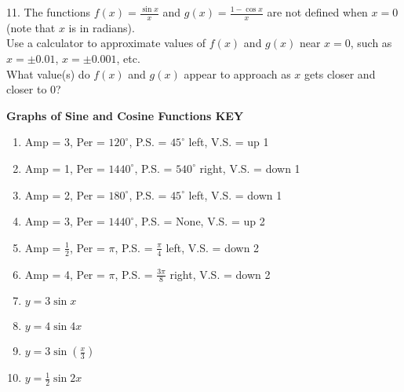 \documentclass{article}
\begin{document}
11. The functions $f(x) = \frac{\sin x}{x}$ and $g(x) = \frac{1 - \cos x}{x}$ are not defined when $x = 0$ (note that $x$ is in radians).
\newline\\


Use a calculator to approximate values of $f(x)$ and $g(x)$ near $x = 0$, such as $x = \pm 0.01$, $x = \pm 0.001$, etc.
\newline\\


What value(s) do $f(x)$ and $g(x)$ appear to approach as $x$ gets closer and closer to 0?



\newpage


\textbf{Graphs of Sine and Cosine Functions KEY}

\begin{enumerate}
    \item Amp = 3, Per = $120^\circ$, P.S. = $45^\circ$ left, V.S. = up 1
    
    \item Amp = 1, Per = $1440^\circ$, P.S. = $540^\circ$ right, V.S. = down 1
    
    \item Amp = 2, Per = $180^\circ$, P.S. = $45^\circ$ left, V.S. = down 1
    
    \item Amp = 3, Per = $1440^\circ$, P.S. = None, V.S. = up 2
    
    \item Amp = $\frac{1}{2}$, Per = $\pi$, P.S. = $\frac{\pi}{4}$ left, V.S. = down 2
    
    \item Amp = 4, Per = $\pi$, P.S. = $\frac{3\pi}{8}$ right, V.S. = down 2
    
    \item $y = 3\sin x$
    
    \item $y = 4\sin 4x$
    
    \item $y = 3\sin\left(\frac{x}{3}\right)$
    
    \item $y = \frac{1}{2}\sin 2x$
\end{enumerate}
\end{document}
